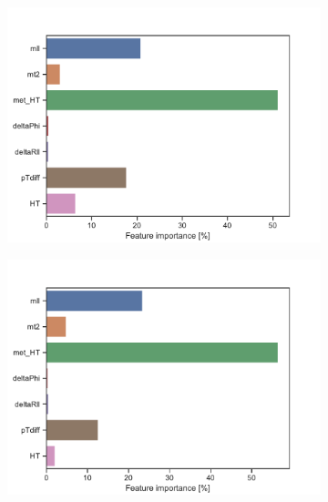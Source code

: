 \begin{figure}[H]
\begin{subfigure}[t!]{0.49\textwidth}
        \includegraphics[width = \textwidth]{Figures/WW/BDT/High_level/Low/featureImportance.pdf}
        \caption{}
        \label{fig:featWWLow}
    \end{subfigure}
    \begin{subfigure}[t!]{0.49\textwidth}
        \includegraphics[width = \textwidth]{Figures/Mono_Z/ML/BDT/High_level/Low/featureImportance.pdf}
        \caption{}
        \label{fig:featMonoZLow}
    \end{subfigure}
    \caption{}
    \label{fig:Non}
\end{figure}

